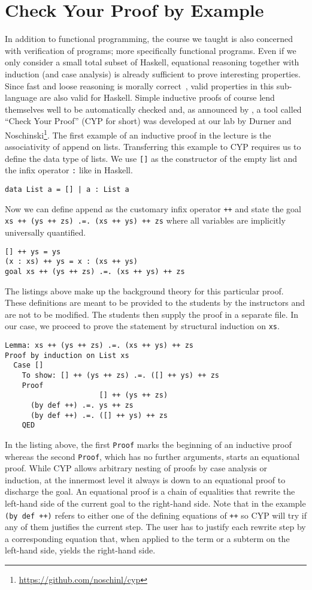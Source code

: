 \section{Check Your Proof by Example}\label{sec:cyp}
In addition to functional programming, the course we taught is also concerned with verification of programs; more specifically functional programs.
Even if we only consider a small total subset of Haskell, equational reasoning together with induction (and case analysis) is already sufficient to prove interesting properties.
Since fast and loose reasoning is morally correct~\cite{fast_and_loose}, valid properties in this sub-language are also valid for Haskell.
Simple inductive proofs of course lend themselves well to be automatically checked and, as announced by \cite{next_1100}, a tool called ``Check Your Proof'' (CYP for short) was developed at our lab by Durner and Noschinski\footnote{\url{https://github.com/noschinl/cyp}}.
The first example of an inductive proof in the lecture is the associativity of append on lists.
Transferring this example to CYP requires us to define the data type of lists.
We use \lstinline![]! as the constructor of the empty list and the infix operator \lstinline!:! like in Haskell.
\begin{lstlisting}
data List a = [] | a : List a
\end{lstlisting}
Now we can define append as the customary infix operator \lstinline!++! and state the goal \lstinline!xs ++ (ys ++ zs) .=. (xs ++ ys) ++ zs! where all variables are implicitly universally quantified.
\begin{lstlisting}
[] ++ ys = ys
(x : xs) ++ ys = x : (xs ++ ys)
goal xs ++ (ys ++ zs) .=. (xs ++ ys) ++ zs
\end{lstlisting}
The listings above make up the background theory for this particular proof.
These definitions are meant to be provided to the students by the instructors and are not to be modified.
The students then supply the proof in a separate file.
In our case, we proceed to prove the statement by structural induction on \lstinline!xs!.
\begin{lstlisting}
Lemma: xs ++ (ys ++ zs) .=. (xs ++ ys) ++ zs
Proof by induction on List xs
  Case []
    To show: [] ++ (ys ++ zs) .=. ([] ++ ys) ++ zs
    Proof
                      [] ++ (ys ++ zs)
      (by def ++) .=. ys ++ zs
      (by def ++) .=. ([] ++ ys) ++ zs
    QED
\end{lstlisting}
In the listing above, the first \lstinline!Proof! marks the beginning of an inductive proof whereas the second \lstinline!Proof!, which has no further arguments, starts an equational proof.
While CYP allows arbitrary nesting of proofs by case analysis or induction, at the innermost level it always is down to an equational proof to discharge the goal.
An equational proof is a chain of equalities that rewrite the left-hand side of the current goal to the right-hand side.
Note that in the example \lstinline!(by def ++)! refers to either one of the defining equations of \lstinline!++! so CYP will try if any of them justifies the current step.
The user has to justify each rewrite step by a corresponding equation that, when applied to the term or a subterm on the left-hand side, yields the right-hand side.

